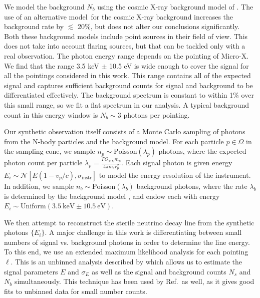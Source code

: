 \documentclass[aps,prd,10pt,twocolumn,superscriptaddress,showpacs]{revtex4-1}
\newcommand{\units}[1]{~\mathrm{#1}}
\begin{document}
We model the background $N_b$ using the cosmic X-ray background model of \cite{Ajello:2008xb}.  The
use of an alternative model\,\cite{2009A&A...493..501M} for the cosmic X-ray background increases the background rate by $\lesssim$ 20\%, but does not alter our
conclusions significantly.  Both these background models include point sources in their field of view.  This does not take into account flaring sources, but that can be tackled only with a real observation.  The photon energy range depends on the pointing of Micro-X.  We find that the range 3.5 keV $\pm$ 10.5 eV is wide enough to cover the signal for all the pointings considered in this work.
 This range contains all of the expected signal and captures
sufficient background counts for signal and background to be differentiated effectively. The
background spectrum is constant to within 1\% over this small range, so we fit a flat spectrum in
our analysis. A typical background count in this energy window is $N_b \sim 3$ photons per pointing.

Our synthetic observation itself consists of a Monte Carlo sampling of photons from the N-body particles
and the background model. For each particle $p \in \Omega$ in the sampling cone, we sample $n_p \sim
\mathrm{Poisson}(\lambda_p)$ photons, where the expected photon count per particle
$\lambda_p=\frac{\Gamma O_\mathrm{MX}m_p}{4\pi m_s r_p^2}$.
Each signal photon is given energy $E_i \sim \mathcal{N}[E(1-v_p/c),
\sigma_\mathrm{instr}]$ to model the energy resolution of the instrument. In
addition, we sample $n_b \sim \mathrm{Poisson}(\lambda_b)$ background photons, where the rate $\lambda_b$ is
determined by the background model \cite{Ajello:2008xb}, and endow each with energy
$E_i \sim \mathrm{Uniform}(3.5\units{keV}\pm10.5\units{eV})$. 

We then attempt to reconstruct the sterile neutrino decay line from the synthetic photons $\{E_i\}$.
A major challenge in this work is differentiating between small numbers of signal vs. background photons in
order to determine the line energy. To this end, we use an extended maximum likelihood analysis for
each pointing $\ell$.  This is an unbinned analysis described by \cite{barlow1990} which allows us to estimate
the signal parameters $E$ and $\sigma_E$ as well as the signal and background counts $N_s$
and $N_b$ simultaneously. This technique has been used by Ref.\,\cite{Figueroa-Feliciano:2015gwa} as well, as it gives
good fits to unbinned data for small number counts. 
\end{document}
